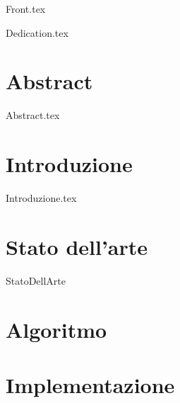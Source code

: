 \documentclass[12pt,onesidet]{report}
\begin{document}
	
	\begin{titlepage}
     {Front.tex}
    \end{titlepage}

  
    {Dedication.tex}
    
    
    \chapter*{Abstract}
     {Abstract.tex}
    
    \newpage  
    
    \tableofcontents{}
    \listoftables
    \listoflistings
    
    
    \chapter{Introduzione}
     {Introduzione.tex}
    
    \chapter{Stato dell'arte}
    {StatoDellArte}
    
    \chapter{Algoritmo}
    
    \chapter{Implementazione}
    
     
    
   
    
\end{document}
